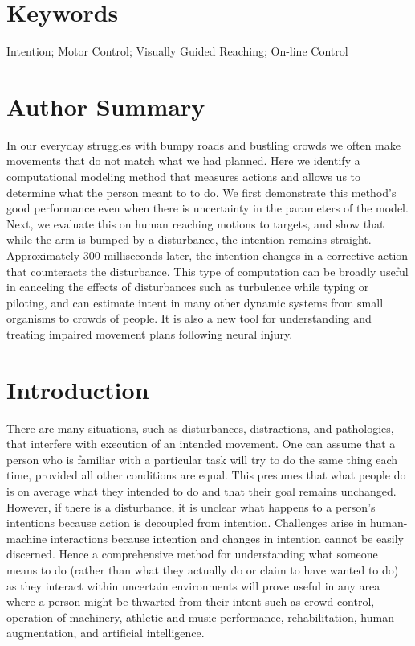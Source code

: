 \documentclass[10pt]{article}
\begin{document}
\section*{Keywords}
Intention; Motor Control; Visually Guided Reaching; On-line Control

\section*{Author Summary}
In our everyday struggles with bumpy roads and bustling crowds we often make movements that do not match what we had planned. Here we identify a computational modeling method that measures actions and allows us to determine what the person meant to to do. We first demonstrate this method's good performance even when there is uncertainty in the parameters of the model. Next, we evaluate this on human reaching motions to targets, and show that while the arm is bumped by a disturbance, the intention remains straight. Approximately 300 milliseconds later, the intention changes in a corrective action that counteracts the disturbance. This type of computation can be broadly useful in canceling the effects of disturbances such as turbulence while typing or piloting, and can estimate intent in many other dynamic systems from small organisms to crowds of people. It is also a new tool for understanding and treating impaired movement plans following neural injury.

\section*{Introduction}
There are many situations, such as disturbances, distractions, and pathologies, that interfere with execution of an intended movement. One can assume that a person who is familiar with a particular task will try to do the same thing each time, provided all other conditions are equal. This presumes that what people do is on average what they intended to do and that their goal remains unchanged. However, if there is a disturbance, it is unclear what happens to a person's intentions because action is decoupled from intention. Challenges arise in human-machine interactions because intention and changes in intention cannot be easily discerned. Hence a comprehensive method for understanding what someone means to do (rather than what they actually do or claim to have wanted to do) as they interact within uncertain environments will prove useful in any area where a person might be thwarted from their intent such as crowd control, operation of machinery, athletic and music performance, rehabilitation, human augmentation, and artificial intelligence.
\end{document}
